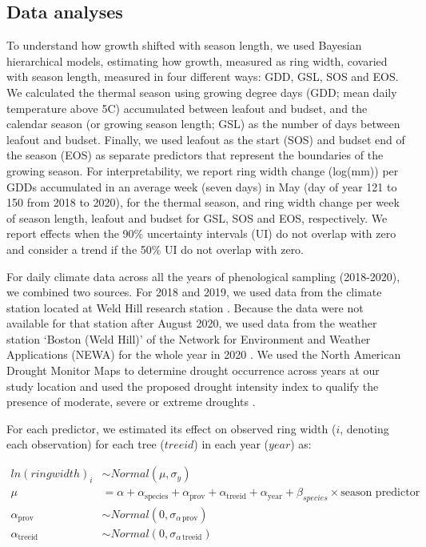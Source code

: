\subsection{Data analyses}
To understand how growth shifted with season length, we used Bayesian hierarchical models, estimating how growth, measured as ring width, covaried with season length, measured in four different ways: GDD, GSL, SOS and EOS. We calculated the thermal season using growing degree days (GDD; mean daily temperature above 5\degree C) accumulated between leafout and budset, and the calendar season (or growing season length; GSL) as the number of days between leafout and budset. Finally, we used leafout as the start (SOS) and budset end of the season (EOS) as separate predictors that represent the boundaries of the growing season. For interpretability, we report ring width change (log(mm)) per GDDs accumulated in an average week (seven days) in May (day of year 121 to 150 from 2018 to 2020), for the thermal season, and ring width change per week of season length, leafout and budset for GSL, SOS and EOS, respectively. We report effects when the 90\% uncertainty intervals (UI) do not overlap with zero and consider a trend if the 50\% UI do not overlap with zero.

For daily climate data across all the years of phenological sampling (2018-2020), we combined two sources. For 2018 and 2019, we used data from the climate station located at Weld Hill research station \citep{arnoldarboretum_weather_2026}. Because the data were not available for that station after August 2020, we used data from the weather station `Boston (Weld Hill)' of the Network for Environment and Weather Applications (NEWA) for the whole year in 2020 \citep[see Figure \ref{fig:climOverlap} for the climate overlap between the two stations in 2020;][]{carroll_network_2026}. We used the North American Drought Monitor Maps to determine drought occurrence across years at our study location and used the proposed drought intensity index to qualify the presence of moderate, severe or extreme droughts \citep{nationalcentersforenvironmentalinformationncei_north_2026}. 

For each predictor, we estimated its effect on observed ring width ($i$, denoting each observation) for each tree ($treeid$) in each year ($year$) as:

\begin{equation}
\begin{aligned} 
ln(ringwidth)_i &\sim Normal(\mu, \sigma_y) \\
\mu &= \alpha + \alpha_{\text{species}} + \alpha_{\text{prov}} + \alpha_{\text{treeid}} + \alpha_{\text{year}} + \beta_{species} \times \text{season predictor} \\
\alpha_{\text{prov}} &\sim Normal(0, \sigma_{\alpha \, \text{prov}}) \\
\alpha_{\text{treeid}} &\sim Normal(0, \sigma_{\alpha \, \text{treeid}}) \\
\end{aligned}
\label{eq:mainMdl}
\end{equation}

